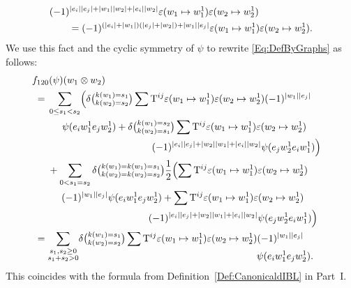 \documentclass[\MainFolder/Text.tex]{subfiles}
\begin{document}
\begin{Example}
$$\begin{aligned}&(-1)^{|e_i||e_j| + |w_1||w_2| + |e_i||w_2|} \varepsilon(w_1 \mapsto w_1^1)\varepsilon(w_2\mapsto w_2^1)\\
&\qquad= (-1)^{(|e_i| + |w_1|)(|e_j| + |w_2|) + |w_1| |e_j|}\varepsilon(w_1 \mapsto w_1^1)\varepsilon(w_2\mapsto w_2^1).\end{aligned}$$
We use this fact and the cyclic symmetry of $\psi$ to rewrite \eqref{Eq:DefByGraphs} as follows:
$$\begin{aligned}
&f_{120}(\psi)(w_1 \otimes w_2)
\\&\; = \begin{aligned}[t]
& \begin{multlined}[t]\sum_{0\le s_1 < s_2} \Bigl(\delta\bigl(\substack{k(w_1) = s_1 \\ k(w_2) = s_2}\bigr)\sum \TKer^{ij} \varepsilon(w_1\mapsto w_1^1) \varepsilon(w_2\mapsto w_2^1)(-1)^{\Abs{w_1} \Abs{e_j}} \\
\psi(e_i w_1^1 e_j w_2^1) +\delta\bigl(\substack{k(w_1) = s_2 \\ k(w_2) = s_1}\bigr) \sum \TKer^{ij} \varepsilon(w_1\mapsto w_1^1)\varepsilon(w_2\mapsto w_2^1)\\ (-1)^{\Abs{e_i} \Abs{e_j} + \Abs{w_2} \Abs{w_1} + \Abs{e_i}\Abs{w_2}} \psi(e_j w_2^1 e_i w_1^1) \Bigr)
\end{multlined}\\
&\begin{multlined}{}+\sum_{0< s_1 = s_2} \delta\bigl(\substack{k(w_1) = k(w_1) = s_1 \\ k(w_2) = k(w_2) = s_2}\bigr) 
\frac{1}{2} \Bigl(\sum \TKer^{ij} \varepsilon(w_1\mapsto w_1^1) \varepsilon(w_2\mapsto w_2^1)\\ (-1)^{\Abs{w_1} \Abs{e_j}} \psi(e_i w_1^1 e_j w_2^1) + \sum \TKer^{ij} \varepsilon(w_1\mapsto w_1^1)\varepsilon(w_2\mapsto w_2^1) \\ (-1)^{\Abs{e_i} \Abs{e_j} + \Abs{w_2} \Abs{w_1} + \Abs{e_i}\Abs{w_2}} \psi(e_j w_2^1 e_i w_1^1) \Bigr) \end{multlined}
\end{aligned} \\
&\; = \begin{multlined}[t] \smash{\sum_{\substack{s_1, s_2 \ge 0 \\ s_1 + s_2 > 0}}} \delta\bigl(\substack{k(w_1) = s_1 \\ k(w_2) = s_2}\bigr) \sum \TKer^{ij} \varepsilon(w_1 \mapsto w_1^1)\varepsilon(w_2 \mapsto w_2^1)(-1)^{\Abs{w_1}\Abs{e_j}} \\ \psi(e_i w_1^1 e_j w_2^1).\end{multlined}
\end{aligned}$$
This coincides with the formula from Definition~\ref{Def:CanonicaldIBL} in Part~I.
\end{Example}
\end{document}
